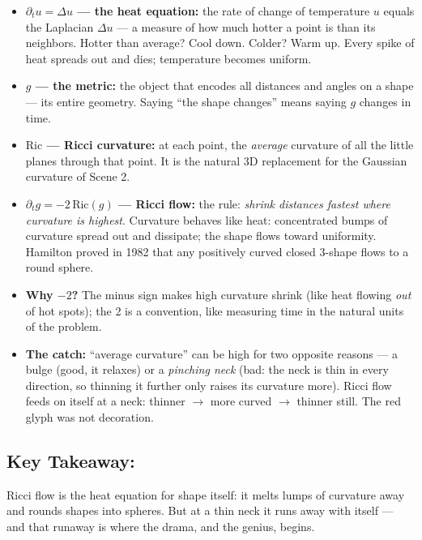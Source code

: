 \documentclass[11pt]{article}
\begin{document}
\begin{itemize}
  \item \textbf{\( \partial_t u = \Delta u \) --- the heat equation:} the rate of
  change of temperature $u$ equals the Laplacian $\Delta u$ --- a measure of how much
  hotter a point is than its neighbors. Hotter than average? Cool down. Colder?
  Warm up. Every spike of heat spreads out and dies; temperature becomes uniform.
  \item \textbf{\( g \) --- the metric:} the object that encodes all distances and
  angles on a shape --- its entire geometry. Saying ``the shape changes'' means
  saying $g$ changes in time.
  \item \textbf{\( \mathrm{Ric} \) --- Ricci curvature:} at each point, the
  \emph{average} curvature of all the little planes through that point. It is the
  natural 3D replacement for the Gaussian curvature of Scene 2.
  \item \textbf{\( \partial_t g = -2\,\mathrm{Ric}(g) \) --- Ricci flow:} the rule:
  \emph{shrink distances fastest where curvature is highest}. Curvature behaves like
  heat: concentrated bumps of curvature spread out and dissipate; the shape flows
  toward uniformity. Hamilton proved in 1982 that any positively curved closed
  3-shape flows to a round sphere.
  \item \textbf{Why $-2$?} The minus sign makes high curvature shrink (like heat
  flowing \emph{out} of hot spots); the 2 is a convention, like measuring time in the
  natural units of the problem.
  \item \textbf{The catch:} ``average curvature'' can be high for two opposite
  reasons --- a bulge (good, it relaxes) or a \emph{pinching neck} (bad: the neck is
  thin in every direction, so thinning it further only raises its curvature more).
  Ricci flow feeds on itself at a neck: thinner $\to$ more curved $\to$ thinner
  still. The red glyph was not decoration.
\end{itemize}

\subsection*{Key Takeaway:}

Ricci flow is the heat equation for shape itself: it melts lumps of curvature away
and rounds shapes into spheres. But at a thin neck it runs away with itself ---
and that runaway is where the drama, and the genius, begins.

\hrulefill
\end{document}
